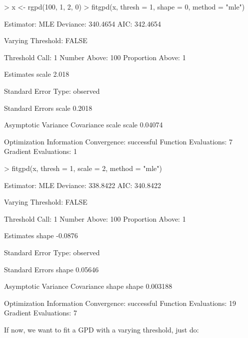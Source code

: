 \documentclass[a4paper]{article}
\numberwithin{equation}{section}
\theoremstyle{definition}
\begin{document}
\begin{Schunk}
\begin{Sinput}
> x <- rgpd(100, 1, 2, 0)
> fitgpd(x, thresh = 1, shape = 0, method = "mle")
\end{Sinput}
\begin{Soutput}
Estimator: MLE 
Deviance: 340.4654 
     AIC: 342.4654 

Varying Threshold: FALSE 

Threshold Call: 1 
Number Above: 100 
Proportion Above: 1 

Estimates
scale  
2.018  

Standard Error Type: observed 

Standard Errors
 scale  
0.2018  

Asymptotic Variance Covariance
       scale  
scale  0.04074

Optimization Information
  Convergence: successful 
  Function Evaluations: 7 
  Gradient Evaluations: 1 
\end{Soutput}
\begin{Sinput}
> fitgpd(x, thresh = 1, scale = 2, method = "mle")
\end{Sinput}
\begin{Soutput}
Estimator: MLE 
Deviance: 338.8422 
     AIC: 340.8422 

Varying Threshold: FALSE 

Threshold Call: 1 
Number Above: 100 
Proportion Above: 1 

Estimates
  shape  
-0.0876  

Standard Error Type: observed 

Standard Errors
  shape  
0.05646  

Asymptotic Variance Covariance
       shape   
shape  0.003188

Optimization Information
  Convergence: successful 
  Function Evaluations: 19 
  Gradient Evaluations: 7 
\end{Soutput}
\end{Schunk}

If now, we want to fit a GPD with a varying threshold, just do:
\end{document}
